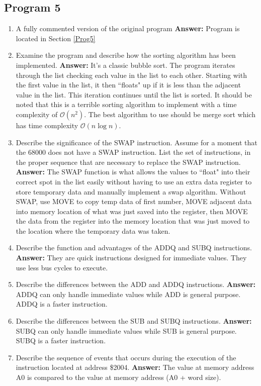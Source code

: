 \documentclass[12pt, twocolumn]{article}
\begin{document}
\subsection{Program 5}

\begin{enumerate}
		\item A fully commented version of the original program
		\subitem \hspace{-0.7cm}\textbf{Answer:} Program is located in Section \ref{Prog5}
		\item Examine the program and describe how the sorting algorithm has been implemented.
		\subitem \hspace{-0.7cm}\textbf{Answer:} It's a classic bubble sort. The program iterates through the list checking each value in the list to each other. Starting with the first value in the list, it then ``floats" up if it is less than the adjacent value in the list. This iteration continues until the list is sorted. It should be noted that this is a terrible sorting algorithm to implement with a time complexity of $\mathcal{O}(n^2)$. The best algorithm to use should be merge sort which has time complexity $\mathcal{O}(n\log n)$.
		\item Describe the significance of the SWAP instruction. Assume for a moment that the 68000 does not have a SWAP instruction. List the set of instructions, in the proper sequence that are necessary to replace the SWAP instruction.
		\subitem \hspace{-0.7cm}\textbf{Answer:} The SWAP function is what allows the values to ``float" into their correct spot in the list easily without having to use an extra data register to store temporary data and manually implement a swap algorithm. Without SWAP, use MOVE to copy temp data of first number, MOVE adjacent data into memory location of what was just saved into the register, then MOVE the data from the register into the memory location that was just moved to the location where the temporary data was taken.
		\item Describe the function and advantages of the ADDQ and SUBQ instructions.
		\subitem \hspace{-0.7cm}\textbf{Answer:} They are quick instructions designed for immediate values. They use less bus cycles to execute.
		\item Describe the differences between the ADD and ADDQ instructions.
		\subitem \hspace{-0.7cm}\textbf{Answer:} ADDQ can only handle immediate values while ADD is general purpose. ADDQ is a faster instruction.
		\item Describe the differences between the SUB and SUBQ instructions. 
		\subitem \hspace{-0.7cm}\textbf{Answer:}  SUBQ can only handle immediate values while SUB is general purpose. SUBQ is a faster instruction.
		\item Describe the sequence of events that occurs during the execution of the instruction
		located at address \$2004.
		\subitem \hspace{-0.7cm}\textbf{Answer:} The value at memory address A0 is compared to the value at memory address (A0 + word size).
\end{enumerate}
\end{document}

